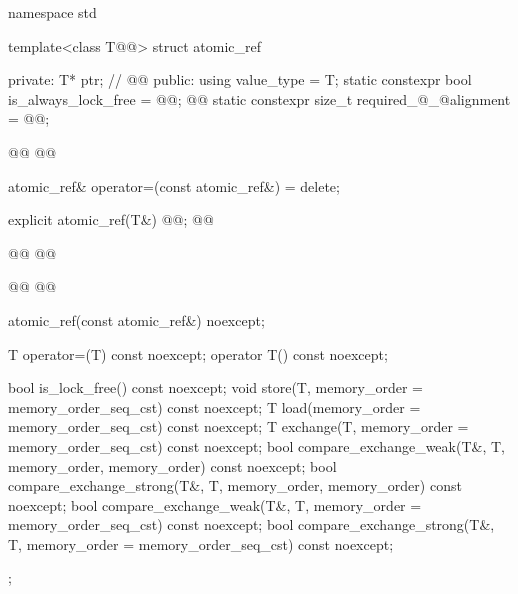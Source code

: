 \begin{codeblock}
namespace std {

  template<class T@@> struct atomic_ref {
  private:
    T* ptr;      // \expos
    @@
  public:
    using value_type = T;
    static constexpr bool is_always_lock_free = @@;
    @@
    static constexpr size_t required_@_@alignment = @@;

    @@
    @@

    atomic_ref& operator=(const atomic_ref&) = delete;

    explicit atomic_ref(T&) @@;
    @@
   
    @@
    @@
    
    @@
    @@

    atomic_ref(const atomic_ref&) noexcept;

    T operator=(T) const noexcept;
    operator T() const noexcept;

    bool is_lock_free() const noexcept;
    void store(T, memory_order = memory_order_seq_cst) const noexcept;
    T load(memory_order = memory_order_seq_cst) const noexcept;
    T exchange(T, memory_order = memory_order_seq_cst) const noexcept;
    bool compare_exchange_weak(T&, T,
                               memory_order, memory_order) const noexcept;
    bool compare_exchange_strong(T&, T,
                                 memory_order, memory_order) const noexcept;
    bool compare_exchange_weak(T&, T,
                               memory_order = memory_order_seq_cst) const noexcept;
    bool compare_exchange_strong(T&, T,
                                 memory_order = memory_order_seq_cst) const noexcept;
  };
}
\end{codeblock}
~\\

